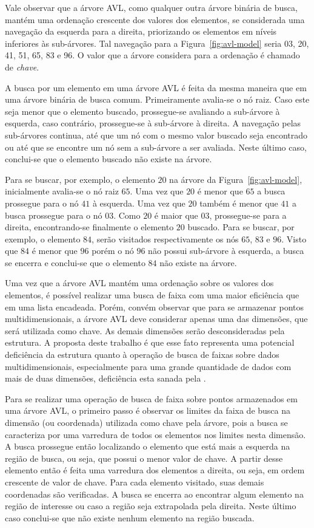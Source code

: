 Vale observar que a árvore AVL, como qualquer outra árvore binária de busca,
mantém uma ordenação crescente dos valores dos elementos, se considerada
uma navegação da esquerda para a direita, priorizando os elementos em níveis inferiores
às sub-árvores.
Tal navegação para a Figura~\ref{fig:avl-model} seria 03, 20, 41, 51, 65, 83 e 96.
O valor que a árvore considera para a ordenação é chamado de \emph{chave}.

A busca por um elemento em uma árvore AVL é feita da mesma maneira
que em uma árvore binária de busca comum.
Primeiramente avalia-se o nó raiz. Caso este seja menor que o elemento buscado,
prossegue-se avaliando a sub-árvore à esquerda, caso contrário, prossegue-se à sub-árvore à direita.
A navegação pelas sub-árvores continua, até que um nó com o mesmo valor buscado
seja encontrado ou até que se encontre um nó sem a sub-árvore a ser avaliada.
Neste último caso, conclui-se que o elemento buscado não existe na árvore.

Para se buscar, por exemplo, o elemento $20$ na árvore da Figura~\ref{fig:avl-model}, inicialmente avalia-se o nó raiz $65$.
Uma vez que $20$ é menor que $65$ a busca prossegue para o nó $41$ à esquerda.
Uma vez que $20$ também é menor que $41$ a busca prossegue para o nó $03$.
Como $20$ é maior que $03$, prossegue-se para a direita, encontrando-se finalmente o elemento $20$ buscado.
Para se buscar, por exemplo, o elemento $84$, serão visitados respectivamente
os nós $65$, $83$ e $96$.
Visto que $84$ é menor que $96$ porém o nó $96$ não possui sub-árvore à esquerda,
a busca se encerra e conclui-se que o elemento $84$ não existe na árvore.

Uma vez que a árvore AVL mantém uma ordenação sobre os valores dos elementos,
é possível realizar uma busca de faixa com uma maior eficiência que em uma lista encadeada.
Porém, convém observar que para se armazenar pontos multidimensionais, a árvore AVL
deve considerar apenas uma das dimensões, que será utilizada como chave.
As demais dimensões serão desconsideradas pela estrutura.
A proposta deste trabalho é que esse fato representa uma potencial deficiência
da estrutura quanto à operação de busca de faixas sobre dados multidimensionais,
especialmente para uma grande quantidade de dados com mais de duas dimensões,
deficiência esta sanada pela \kdtree{}.

Para se realizar uma operação de busca de faixa sobre pontos
armazenados em uma árvore AVL, o primeiro passo é observar os limites da faixa de busca
na dimensão (ou coordenada) utilizada como chave pela árvore, pois a busca
se caracteriza por uma varredura de todos os elementos nos limites nesta dimensão.
A busca prossegue então localizando o elemento que está mais a esquerda na região de busca,
ou seja, que possui o menor valor de chave.
A partir desse elemento então é feita uma varredura dos elementos a direita, ou seja,
em ordem crescente de valor de chave.
Para cada elemento visitado, suas demais coordenadas são verificadas.
A busca se encerra ao encontrar algum elemento na região de interesse ou
caso a região seja extrapolada pela direita.
Neste último caso conclui-se que não existe nenhum elemento na região buscada.

